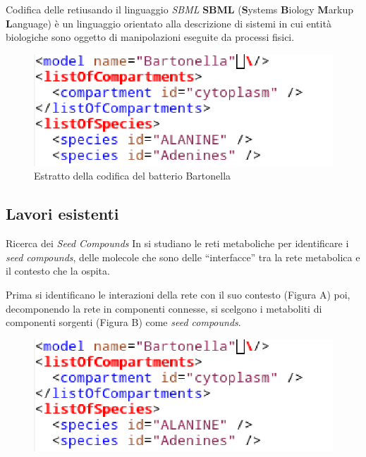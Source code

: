 \documentclass{beamer}
\begin{document}
\begin{frame}{Codifica delle reti}{usando il linguaggio \emph{SBML}}
  \textbf{SBML} (\textbf{S}ystems \textbf{B}iology \textbf{M}arkup
  \textbf{L}anguage) \`e un linguaggio orientato alla descrizione di
  sistemi in cui entit\`a biologiche sono oggetto di manipolazioni
  eseguite da processi fisici.
  \begin{figure}
    \includegraphics[scale=.6]{images/sbml-code-chunk.eps}
    \caption{Estratto della codifica del batterio Bartonella}
  \end{figure}
\end{frame}

\subsection{Lavori esistenti}

\begin{frame}{Ricerca dei \emph{Seed Compounds}}
  In \cite{Borenstein-Kupiec} si studiano le reti metaboliche per
  identificare i \emph{seed compounds}, delle molecole che sono delle
  ``interfacce'' tra la rete metabolica e il contesto che la ospita.

  Prima si identificano le interazioni della rete con il suo contesto
  (Figura A) poi, decomponendo la rete in componenti connesse, si
  scelgono i metaboliti di componenti sorgenti (Figura B) come
  \emph{seed compounds}.

  \begin{figure}
    \includegraphics[scale=.6]{images/sbml-code-chunk.eps}
  \end{figure}

\end{frame}
\end{document}
